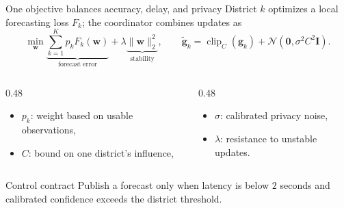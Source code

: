 \begin{frame}{One objective balances accuracy, delay, and privacy}
  District $k$ optimizes a local forecasting loss $F_k$; the coordinator combines updates as
  \begin{equation*}
    \min_{\boldsymbol{w}}
    \underbrace{\sum_{k=1}^{K} p_k F_k(\boldsymbol{w})}_{\text{forecast error}}
    + \lambda\underbrace{\lVert\boldsymbol{w}\rVert_2^2}_{\text{stability}},
    \qquad
    \widetilde{\boldsymbol{g}}_k
    = \operatorname{clip}_{C}(\boldsymbol{g}_k)
      + \mathcal{N}(\boldsymbol{0},\sigma^2 C^2\mathbf{I}).
  \end{equation*}

  \begin{columns}[T,onlytextwidth]
    \begin{column}{0.48\textwidth}
      \begin{itemize}
        \item $p_k$: weight based on usable observations,
        \item $C$: bound on one district's influence,
      \end{itemize}
    \end{column}
    \begin{column}{0.48\textwidth}
      \begin{itemize}
        \item $\sigma$: calibrated privacy noise,
        \item $\lambda$: resistance to unstable updates.
      \end{itemize}
    \end{column}
  \end{columns}

  \begin{exampleblock}{Control contract}
    Publish a forecast only when latency is below $2$ seconds and calibrated confidence exceeds the district threshold.
  \end{exampleblock}
\end{frame}


